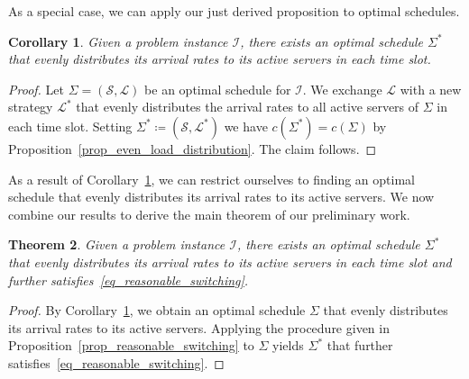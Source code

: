 \documentclass[hidelinks]{article}
\theoremstyle{plain}
\newtheorem{thm}{Theorem}[section]
\newtheorem{cor}[thm]{Corollary}
\theoremstyle{definition}
\theoremstyle{rem}
\newcommand{\inp}{\mathcal{I}}
\newcommand{\costs}{c}
\begin{document}
As a special case, we can apply our just derived proposition to optimal schedules.
\begin{cor}\label{cor_even_load_distribution}
Given a problem instance $\inp$, there exists an optimal schedule $\Sigma^*$ that evenly distributes its arrival rates to its active servers in each time slot.
\end{cor}
\begin{proof}
Let $\Sigma=(\mathcal{S},\mathcal{L})$ be an optimal schedule for $\inp$. We exchange $\mathcal{L}$ with a new strategy $\mathcal{L}^*$ that evenly distributes the arrival rates to all active servers of $\Sigma$ in each time slot. Setting $\Sigma^*\coloneqq(\mathcal{S},\mathcal{L}^*)$ we have $\costs(\Sigma^*)=\costs(\Sigma)$ by Proposition~\ref{prop_even_load_distribution}. The claim follows.
\end{proof}
As a result of Corollary~\ref{cor_even_load_distribution}, we can restrict ourselves to finding an optimal schedule that evenly distributes its arrival rates to its active servers. We now combine our results to derive the main theorem of our preliminary work.
\begin{thm}\label{thm_even_load_distribution_reasonable_switching}
Given a problem instance $\inp$, there exists an optimal schedule $\Sigma^*$ that evenly distributes its arrival rates to its active servers in each time slot and further satisfies~\eqref{eq_reasonable_switching}.
\end{thm}
\begin{proof}
By Corollary~\ref{cor_even_load_distribution}, we obtain an optimal schedule $\Sigma$ that evenly distributes its arrival rates to its active servers. Applying the procedure given in Proposition~\ref{prop_reasonable_switching} to $\Sigma$ yields $\Sigma^*$ that further satisfies~\eqref{eq_reasonable_switching}.
\end{proof}
\end{document}
